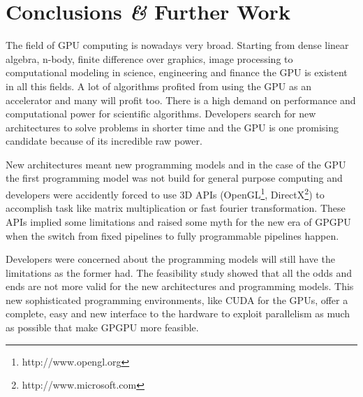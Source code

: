 \chapter{Conclusions \textit{\&} Further Work} %
\label{ch:further_work}







The field of \gls{GPU} computing is nowadays very broad. Starting from dense
linear algebra, n-body, finite difference over graphics, image processing to
computational modeling in science, engineering and finance the \gls{GPU} is
existent in all this fields. A lot of algorithms profited from using the
\gls{GPU} as an accelerator and many will profit too. There is a high demand on
performance and computational power for scientific algorithms. Developers search
for new architectures to solve problems in shorter time and the \gls{GPU} is one
promising candidate because of its incredible raw power. 

New architectures meant new programming models and in the case of the \gls{GPU}
the first programming model was not build for general purpose computing and
developers were accidently forced to use \gls{3D} \glspl{API}
(OpenGL\footnote{http://www.opengl.org},
DirectX\footnote{http://www.microsoft.com}) to accomplish task like matrix
multiplication or fast fourier transformation. These \glspl{API} implied some
limitations and raised some myth for the new era of \gls{GPGPU} when the switch
from fixed pipelines to fully programmable pipelines happen. 

Developers were concerned about the programming models will still have the
limitations as the former had. The feasibility study showed that all the odds
and ends are not more valid for the new architectures and programming models.
This new sophisticated programming environments, like \gls{CUDA} for the
{} \glspl{GPU}, offer a complete, easy and new interface to
the hardware to exploit parallelism as much as possible that make \gls{GPGPU}
more feasible.

